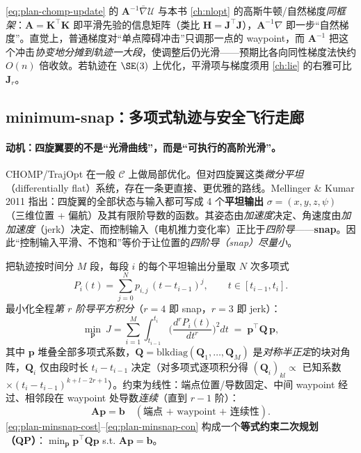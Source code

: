 \begin{insight}
\cref{eq:plan-chomp-update} 的 $\mathbf{A}^{-1}\bar\nabla\mathcal{U}$ 与本书 \cref{ch:nlopt} 的高斯牛顿/自然梯度\emph{同框架}：$\mathbf{A}=\mathbf{K}^\top\mathbf{K}$ 即平滑先验的信息矩阵（类比 $\mathbf{H}=\mathbf{J}^\top\mathbf{J}$），$\mathbf{A}^{-1}\nabla$ 即一步“自然梯度”。直觉上，普通梯度对“单点障碍冲击”只调那一点的 waypoint，而 $\mathbf{A}^{-1}$ 把这个冲击\emph{协变地分摊到轨迹一大段}，使调整后仍光滑——预期比各向同性梯度法快约 $O(n)$ 倍收敛。若轨迹在 $\SE(3)$ 上优化，平滑项与梯度须用 \cref{ch:lie} 的右雅可比 $\mathbf{J}_r$。
\end{insight}

\subsection{minimum-snap：多项式轨迹与安全飞行走廊}
\label{sec:plan-minsnap}

\paragraph{动机：四旋翼要的不是“光滑曲线”，而是“可执行的高阶光滑”。}
CHOMP/TrajOpt 在一般 $\mathcal{C}$ 上做局部优化。但对四旋翼这类\emph{微分平坦}（differentially flat）系统，存在一条更直接、更优雅的路线。Mellinger \& Kumar 2011\cite{mellinger2011minimum} 指出：四旋翼的全部状态与输入都可写成 4 个\textbf{平坦输出} $\sigma=(x,y,z,\psi)$（三维位置 + 偏航）及其有限阶导数的函数。其姿态由\emph{加速度}决定、角速度由\emph{加加速度}（jerk）决定、而控制输入（电机推力变化率）正比于\emph{四阶导}——\textbf{snap}。因此“控制输入平滑、不饱和”等价于让位置的\emph{四阶导（snap）尽量小}。

\begin{definition}\label{def:plan-minsnap}
把轨迹按时间分 $M$ 段，每段 $i$ 的每个平坦输出分量取 $N$ 次多项式
\begin{equation}
  P_i(t)=\sum_{j=0}^{N}p_{i,j}\,(t-t_{i-1})^{j},\qquad t\in[t_{i-1},t_i].
  \label{eq:plan-poly-seg}
\end{equation}
最小化全程\emph{第 $r$ 阶导平方积分}（$r=4$ 即 snap，$r=3$ 即 jerk）：
\begin{equation}
  \min_{\mathbf{p}}\ J=\sum_{i=1}^{M}\int_{t_{i-1}}^{t_i}\Big(\frac{d^{r}P_i(t)}{dt^{r}}\Big)^2dt
  \;=\;\mathbf{p}^\top\mathbf{Q}\,\mathbf{p},
  \label{eq:plan-minsnap-cost}
\end{equation}
其中 $\mathbf{p}$ 堆叠全部多项式系数，$\mathbf{Q}=\mathrm{blkdiag}(\mathbf{Q}_1,\dots,\mathbf{Q}_M)$ 是\emph{对称半正定}的块对角阵，$\mathbf{Q}_i$ 仅由段时长 $t_i-t_{i-1}$ 决定（对多项式逐项积分得 $(\mathbf{Q}_i)_{kl}\propto$ 已知系数 $\times(t_i-t_{i-1})^{k+l-2r+1}$）。约束为线性：端点位置/导数固定、中间 waypoint 经过、相邻段在 waypoint 处导数\emph{连续}（直到 $r-1$ 阶）：
\begin{equation}
  \mathbf{A}\mathbf{p}=\mathbf{b}\quad(\text{端点 + waypoint + 连续性}).
  \label{eq:plan-minsnap-con}
\end{equation}
\cref{eq:plan-minsnap-cost}--\cref{eq:plan-minsnap-con} 构成一个\textbf{等式约束二次规划（QP）}：$\min_{\mathbf{p}}\mathbf{p}^\top\mathbf{Q}\mathbf{p}$ s.t. $\mathbf{A}\mathbf{p}=\mathbf{b}$。
\end{definition}


